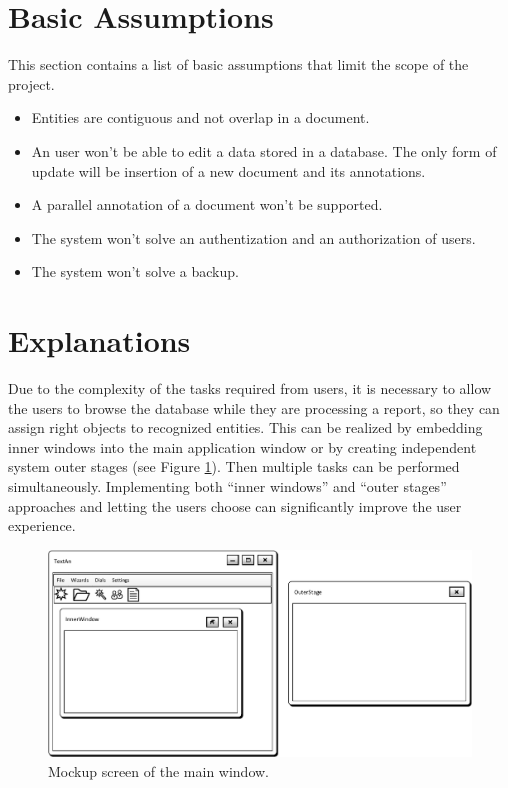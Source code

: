 \section{Basic Assumptions}

This section contains a list of basic assumptions that limit the scope of the
project.

\begin{itemize}
	\item Entities are contiguous and not overlap in a document.
	\item An user won't be able to edit a data stored in a database. The only form
	of update will be insertion of a new document and its annotations.
	\item A parallel annotation of a document won't be supported.
	\item The system won't solve an authentization and  an authorization of users.
	\item The system won't solve a backup.
\end{itemize}

\section{Explanations}


Due to the complexity of the tasks required from users, it is necessary to allow
the users to browse the database while they are processing a report, so they
can assign right objects to recognized entities. This can be realized by
embedding inner windows into the main application window or by creating
independent system outer stages (see Figure \ref{fig:MockupMainWindow}).
Then multiple tasks can be performed simultaneously. Implementing both
``inner windows'' and ``outer stages'' approaches and letting the users choose can
significantly improve the user experience.

\begin{figure}[!htb]
        \centering
        \includegraphics[width=\textwidth]{Images/MockupMainWindow}
        \caption{Mockup screen of the main window.}
        \label{fig:MockupMainWindow}
\end{figure}

